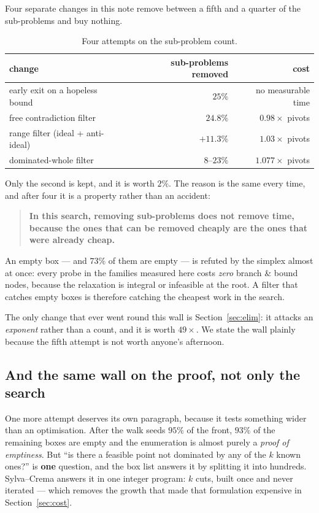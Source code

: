\documentclass[11pt,a4paper]{article}
\begin{document}
Four separate changes in this note remove between a fifth and a quarter of the
sub-problems and buy nothing.

\begin{table}[h]
\centering
\caption{Four attempts on the sub-problem count.}
\begin{tabular}{lrr}
\toprule
change & sub-problems removed & cost \\
\midrule
early exit on a hopeless bound      & $25\%$        & no measurable time \\
free contradiction filter           & $24.8\%$      & $0.98\times$ pivots \\
range filter (ideal + anti-ideal)   & $+11.3\%$     & $1.03\times$ pivots \\
dominated-whole filter              & $8$--$23\%$   & $1.077\times$ pivots \\
\bottomrule
\end{tabular}
\end{table}

\noindent
Only the second is kept, and it is worth $2\%$.  The reason is the same every
time, and after four it is a property rather than an accident:

\begin{quote}
\textbf{In this search, removing sub-problems does not remove time, because
the ones that can be removed cheaply are the ones that were already cheap.}
\end{quote}

An empty box --- and $73\%$ of them are empty --- is refuted by the simplex
almost at once: every probe in the families measured here costs \emph{zero}
branch \& bound nodes, because the relaxation is integral or infeasible at the
root.  A filter that catches empty boxes is therefore catching the cheapest
work in the search.

The only change that ever went round this wall is Section~\ref{sec:elim}: it
attacks an \emph{exponent} rather than a count, and it is worth $49\times$.
We state the wall plainly because the fifth attempt is not worth anyone's
afternoon.

\subsection{And the same wall on the proof, not only the search}
\label{sec:cert}

One more attempt deserves its own paragraph, because it tests something wider
than an optimisation.  After the walk seeds $95\%$ of the front, $93\%$ of the
remaining boxes are empty and the enumeration is almost purely a \emph{proof of
emptiness}.  But ``is there a feasible point not dominated by any of the $k$
known ones?'' is \textbf{one} question, and the box list answers it by
splitting it into hundreds.  Sylva--Crema answers it in one integer program:
$k$ cuts, built once and never iterated --- which removes the growth that made
that formulation expensive in Section~\ref{sec:cost}.
\end{document}
